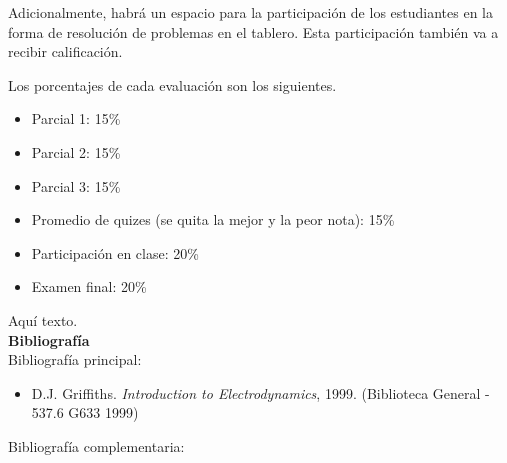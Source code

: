 \documentclass[letterpaper,10pt,onecolumn]{article}
\begin{document}
Adicionalmente, habr\'a un espacio para la participaci\'on de
los estudiantes en la forma de resoluci\'on de problemas en el
tablero. Esta participaci\'on tambi\'en va a recibir calificaci\'on.

Los porcentajes de cada evaluaci\'on son los siguientes.
\begin{itemize}
\item Parcial 1: 15\%
\item Parcial 2: 15\%
\item Parcial 3: 15\%
\item Promedio de quizes (se quita la mejor y la peor nota): 15\%
\item Participaci\'on en clase: 20\%
\item Examen final: 20\%
\end{itemize}




\noindent\normalsize Aqu\'i texto.\\[0.1cm]

\noindent\textbf{\large {} \quad
  Bibliograf\'ia}\\[-0.2cm] 


\noindent\normalsize Bibliograf\'ia principal:

\begin{itemize}
	\item D.J. Griffiths. \textit{Introduction to
          Electrodynamics}, 1999. (Biblioteca General - 537.6 G633
          1999) 
\end{itemize}

\noindent\normalsize Bibliograf\'ia complementaria:
\end{document}
